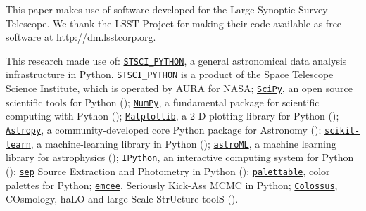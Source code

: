 \documentclass[a4paper,fleqn,usenatbib]{mnras}
\begin{document}
  This paper makes use of software developed for the Large Synoptic Survey 
  Telescope. We thank the LSST Project for making their code available as free 
  software at http://dm.lsstcorp.org.
 
  This research made use of:
  \href{http://www.stsci.edu/institute/software_hardware/pyraf/stsci\_python}{\texttt{STSCI\_PYTHON}},
      a general astronomical data analysis infrastructure in Python. 
      \texttt{STSCI\_PYTHON} is a product of the Space Telescope Science Institute, 
      which is operated by AURA for NASA;
  \href{http://www.scipy.org/}{\texttt{SciPy}},
      an open source scientific tools for Python (\citealt{SciPy});
  \href{http://www.numpy.org/}{\texttt{NumPy}}, 
      a fundamental package for scientific computing with Python (\citealt{NumPy});
  \href{http://matplotlib.org/}{\texttt{Matplotlib}}, 
      a 2-D plotting library for Python (\citealt{Matplotlib});
  \href{http://www.astropy.org/}{\texttt{Astropy}}, a community-developed 
      core Python package for Astronomy (\citealt{AstroPy}); 
  \href{http://scikit-learn.org/stable/index.html}{\texttt{scikit-learn}},
      a machine-learning library in Python (\citealt{scikit-learn}); 
  \href{http://www.astroml.org/}{\texttt{astroML}}, 
      a machine learning library for astrophysics (\citealt{astroML});
  \href{https://ipython.org}{\texttt{IPython}}, 
      an interactive computing system for Python (\citealt{IPython});
  \href{https://github.com/kbarbary/sep}{\texttt{sep}} 
      Source Extraction and Photometry in Python (\citealt{PythonSEP});
  \href{https://jiffyclub.github.io/palettable/}{\texttt{palettable}},
      color palettes for Python;
  \href{http://dan.iel.fm/emcee/current/}{\texttt{emcee}}, 
      Seriously Kick-Ass MCMC in Python;
  \href{http://bdiemer.bitbucket.org/}{\texttt{Colossus}}, 
      COsmology, haLO and large-Scale StrUcture toolS (\citealt{Colossus}).





%
\end{document}
